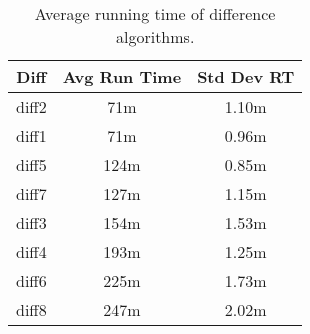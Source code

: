 \begin{table}[tbph]
\begin{center}
\begin{tabular}{|c||c|c|}
\hline
Diff & Avg Run Time & Std Dev RT  \\
\hline
\hline
diff2 & 71m & 1.10m \\
diff1 & 71m & 0.96m \\
diff5 & 124m & 0.85m \\
diff7 & 127m & 1.15m \\
diff3 & 154m & 1.53m \\
diff4 & 193m & 1.25m \\
diff6 & 225m & 1.73m \\
diff8 & 247m & 2.02m \\
\hline
\end{tabular}
\end{center}
\caption{Average running time of difference algorithms.}
\label{tab:difftiming}
\end{table}
